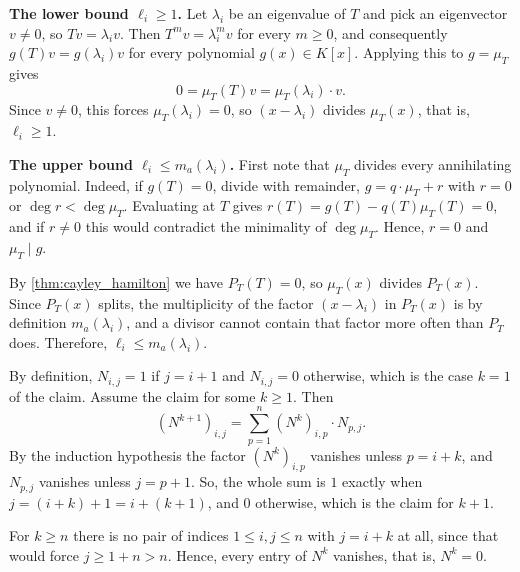 \begin{exercisesolution}
\label{sol:minimal_poly_exponent_bounds}
\textbf{The lower bound $\ell_i \ge 1$.} Let $\lambda_i$ be an eigenvalue of $T$ and pick an eigenvector $v \neq 0$, so $Tv = \lambda_i v$. Then $T^m v = \lambda_i^m v$ for every $m \ge 0$, and consequently $g(T)v = g(\lambda_i) v$ for every polynomial $g(x) \in K[x]$. Applying this to $g = \mu_T$ gives
\[ 0 = \mu_T(T) v = \mu_T(\lambda_i) \cdot v. \]
Since $v \neq 0$, this forces $\mu_T(\lambda_i) = 0$, so $(x - \lambda_i)$ divides $\mu_T(x)$, that is, $\ell_i \ge 1$.

\textbf{The upper bound $\ell_i \le m_a(\lambda_i)$.} First note that $\mu_T$ divides every annihilating polynomial. Indeed, if $g(T) = 0$, divide with remainder, $g = q \cdot \mu_T + r$ with $r = 0$ or $\deg r < \deg \mu_T$. Evaluating at $T$ gives $r(T) = g(T) - q(T)\mu_T(T) = 0$, and if $r \neq 0$ this would contradict the minimality of $\deg \mu_T$. Hence, $r = 0$ and $\mu_T \mid g$.

By \cref{thm:cayley_hamilton} we have $P_T(T) = 0$, so $\mu_T(x)$ divides $P_T(x)$. Since $P_T(x)$ splits, the multiplicity of the factor $(x - \lambda_i)$ in $P_T(x)$ is by definition $m_a(\lambda_i)$, and a divisor cannot contain that factor more often than $P_T$ does. Therefore, $\ell_i \le m_a(\lambda_i)$.
\end{exercisesolution}

\begin{exercisesolution}
\label{sol:powers_of_N_direct}
By definition, $N_{i,j} = 1$ if $j = i+1$ and $N_{i,j} = 0$ otherwise, which is the case $k = 1$ of the claim. Assume the claim for some $k \ge 1$. Then
\[
    \left(N^{k+1}\right)_{i,j} = \sum_{p=1}^n \left(N^k\right)_{i,p} \cdot N_{p,j}.
\]
By the induction hypothesis the factor $\left(N^k\right)_{i,p}$ vanishes unless $p = i+k$, and $N_{p,j}$ vanishes unless $j = p+1$. So, the whole sum is $1$ exactly when $j = (i+k) + 1 = i + (k+1)$, and $0$ otherwise, which is the claim for $k+1$.

For $k \ge n$ there is no pair of indices $1 \le i, j \le n$ with $j = i + k$ at all, since that would force $j \ge 1 + n > n$. Hence, every entry of $N^k$ vanishes, that is, $N^k = 0$.
\end{exercisesolution}

